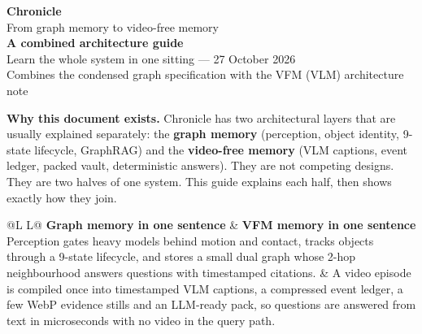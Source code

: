 \documentclass[10pt,a4paper]{article}
\newcommand{\kw}[1]{\textcolor{accent2}{\textbf{#1}}}
\newcommand{\vlm}[1]{\textcolor{vlm}{\textbf{#1}}}
\newcommand{\panel}[1]{%
  \noindent\colorbox{panel}{%
    \begin{minipage}{\dimexpr\linewidth-2\fboxsep\relax}
    \vspace{2pt}#1\vspace{2pt}
    \end{minipage}}%
}
\begin{document}
\begin{center}
{\LARGE\bfseries Chronicle}\\[3pt]
{\Large From graph memory to video-free memory}\\[5pt]
{\large\color{accent}\bfseries A combined architecture guide}\\[6pt]
{\color{muted}\small Learn the whole system in one sitting --- 27 October 2026}\\[2pt]
{\color{muted}\small Combines the condensed graph specification with the VFM (VLM) architecture note}
\end{center}

\begin{center}
\end{center}

\vspace{2pt}

\panel{
\textbf{Why this document exists.} Chronicle has two architectural layers that are usually explained
separately: the \kw{graph memory} (perception, object identity, 9-state lifecycle, GraphRAG) and the
\vlm{video-free memory} (VLM captions, event ledger, packed vault, deterministic answers).
They are not competing designs. They are two halves of one system. This guide explains each half,
then shows exactly how they join.
}

\vspace{2pt}

\begin{center}
\small
\begin{tabularx}{\linewidth}{@{}L L@{}}
\toprule
\textbf{Graph memory in one sentence} & \textbf{VFM memory in one sentence} \\
\midrule
Perception gates heavy models behind motion and contact, tracks objects through a 9-state
lifecycle, and stores a small dual graph whose 2-hop neighbourhood answers questions with
timestamped citations. &
A video episode is compiled once into timestamped VLM captions, a compressed event ledger,
a few WebP evidence stills and an LLM-ready pack, so questions are answered from text in
microseconds with no video in the query path. \\
\bottomrule
\end{tabularx}
\end{center}
\end{document}
